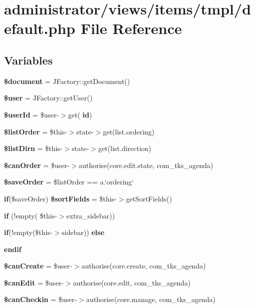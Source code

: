 \section{administrator/views/items/tmpl/default.php File Reference}
\label{administrator_2views_2items_2tmpl_2default_8php}
\subsection*{Variables}
\begin{DoxyCompactItemize}
\item 
\textbf{ \$document} = J\+Factory\+::get\+Document()
\item 
\textbf{ \$user} = J\+Factory\+::get\+User()
\item 
\textbf{ \$user\+Id} = \$user-\/$>$get(\textquotesingle{}\textbf{ id}\textquotesingle{})
\item 
\textbf{ \$list\+Order} = \$this-\/$>$state-\/$>$get(\textquotesingle{}list.\+ordering\textquotesingle{})
\item 
\textbf{ \$list\+Dirn} = \$this-\/$>$state-\/$>$get(\textquotesingle{}list.\+direction\textquotesingle{})
\item 
\textbf{ \$can\+Order} = \$user-\/$>$authorise(\textquotesingle{}core.\+edit.\+state\textquotesingle{}, \textquotesingle{}com\+\_\+tks\+\_\+agenda\textquotesingle{})
\item 
\textbf{ \$save\+Order} = \$list\+Order == \textquotesingle{}a.`ordering`\textquotesingle{}
\item 
\textbf{ if}(\$save\+Order) \textbf{ \$sort\+Fields} = \$this-\/$>$get\+Sort\+Fields()
\item 
\textbf{ if} (!empty( \$this-\/$>$extra\+\_\+sidebar))
\item 
\textbf{ if}(!empty(\$this-\/$>$sidebar)) \textbf{ else}
\item 
\textbf{ endif}
\item 
\textbf{ \$can\+Create} = \$user-\/$>$authorise(\textquotesingle{}core.\+create\textquotesingle{}, \textquotesingle{}com\+\_\+tks\+\_\+agenda\textquotesingle{})
\item 
\textbf{ \$can\+Edit} = \$user-\/$>$authorise(\textquotesingle{}core.\+edit\textquotesingle{}, \textquotesingle{}com\+\_\+tks\+\_\+agenda\textquotesingle{})
\item 
\textbf{ \$can\+Checkin} = \$user-\/$>$authorise(\textquotesingle{}core.\+manage\textquotesingle{}, \textquotesingle{}com\+\_\+tks\+\_\+agenda\textquotesingle{})

\end{DoxyCompactItemize}
